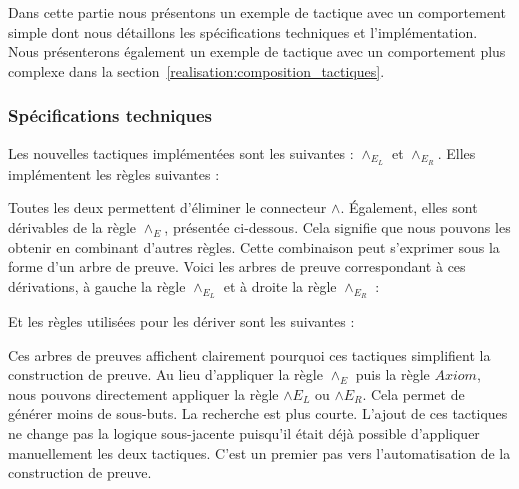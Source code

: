\documentclass[french,titlepage]{article}
\begin{document}
Dans cette partie nous présentons un exemple de tactique avec un comportement simple dont nous détaillons les spécifications techniques et l'implémentation. Nous présenterons également un exemple de tactique avec un comportement plus complexe dans la section~\ref{realisation:composition_tactiques}.

\subsubsection{Spécifications techniques} \label{realisation:nouvelles_tactiques:specs}
Les nouvelles tactiques implémentées sont les suivantes : $\land_{E_L}$ et $\land_{E_R}$. Elles implémentent les règles suivantes :
Toutes les deux permettent d'éliminer le connecteur $\land$. Également, elles sont dérivables de la règle $\land_E$, présentée ci-dessous. Cela signifie que nous pouvons les obtenir en combinant d'autres règles. Cette combinaison peut s'exprimer sous la forme d'un arbre de preuve. Voici les arbres de preuve correspondant à ces dérivations, à gauche la règle $\land_{E_L}$ et à droite la règle $\land_{E_R}$ :
Et les règles utilisées pour les dériver sont les suivantes :
Ces arbres de preuves affichent clairement pourquoi ces tactiques simplifient la construction de preuve. Au lieu d'appliquer la règle $\land_E$ puis la règle $Axiom$, nous pouvons directement appliquer la règle $\land E_L$ ou $\land E_R$. Cela permet de générer moins de sous-buts. La recherche est plus courte. L'ajout de ces tactiques ne change pas la logique sous-jacente puisqu'il était déjà possible d'appliquer manuellement les deux tactiques. C'est un premier pas vers l'automatisation de la construction de preuve.
\end{document}
